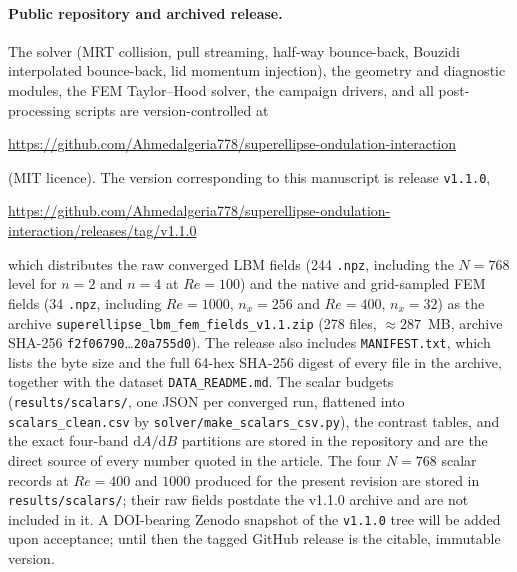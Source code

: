 \paragraph{Public repository and archived release.}
The solver (MRT collision, pull streaming, half-way bounce-back, Bouzidi interpolated bounce-back, lid momentum injection), the geometry and diagnostic modules, the FEM Taylor--Hood solver, the campaign drivers, and all post-processing scripts are version-controlled at
\begin{center}
\url{https://github.com/Ahmedalgeria778/superellipse-ondulation-interaction}
\end{center}
(MIT licence). The version corresponding to this manuscript is release \texttt{v1.1.0},
\begin{center}
\url{https://github.com/Ahmedalgeria778/superellipse-ondulation-interaction/releases/tag/v1.1.0}
\end{center}
which distributes the raw converged LBM fields (244 \texttt{.npz}, including the $N=768$ level for $n=2$ and $n=4$ at $Re=100$) and the native and grid-sampled FEM fields (34 \texttt{.npz}, including $Re=1000$, $n_x=256$ and $Re=400$, $n_x=32$) as the archive \texttt{superellipse\_lbm\_fem\_fields\_v1.1.zip} (278 files, $\approx287$~MB, archive SHA-256 \texttt{f2f06790}\ldots\texttt{20a755d0}). The release also includes \texttt{MANIFEST.txt}, which lists the byte size and the full 64-hex SHA-256 digest of every file in the archive, together with the dataset \texttt{DATA\_README.md}. The scalar budgets (\texttt{results/scalars/}, one JSON per converged run, flattened into \texttt{scalars\_clean.csv} by \texttt{solver/make\_scalars\_csv.py}), the contrast tables, and the exact four-band $\mathrm{d}A/\mathrm{d}B$ partitions are stored in the repository and are the direct source of every number quoted in the article. The four $N=768$ scalar records at $Re=400$ and $1000$ produced for the present revision are stored in \texttt{results/scalars/}; their raw fields postdate the v1.1.0 archive and are not included in it. A DOI-bearing Zenodo snapshot of the \texttt{v1.1.0} tree will be added upon acceptance; until then the tagged GitHub release is the citable, immutable version.
